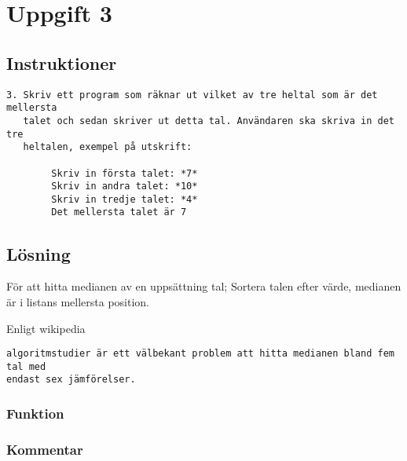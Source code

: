 \section{Uppgift 3}\label{sec:uppg03}

\subsection{Instruktioner}
\begin{verbatim}
3. Skriv ett program som räknar ut vilket av tre heltal som är det mellersta
   talet och sedan skriver ut detta tal. Användaren ska skriva in det tre
   heltalen, exempel på utskrift:

        Skriv in första talet: *7*
        Skriv in andra talet: *10*
        Skriv in tredje talet: *4*
        Det mellersta talet är 7
\end{verbatim}

\subsection{Lösning}
För att hitta medianen av en uppsättning tal;
Sortera talen efter värde, medianen är i listans mellersta position.

Enligt wikipedia 
\begin{verbatim}algoritmstudier är ett välbekant problem att hitta medianen bland fem tal med
endast sex jämförelser.
\end{verbatim}

%
%
%
\subsubsection{Funktion}

\subsubsection{Kommentar}


